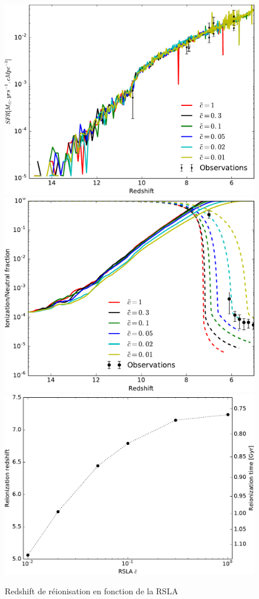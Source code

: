 \begin{figure}[htpb]
        \includegraphics[height=.3\textheight]{img/04_mapreio/SFR.pdf} 
        \includegraphics[height=.3\textheight]{img/04_mapreio/xion.pdf} 
        \includegraphics[height=.3\textheight]{img/04_mapreio/z_rsla.pdf} 
        \caption{Redshift de réionisation en fonction de la RSLA
        }
 		\label{fig:zrsla}
\end{figure}

